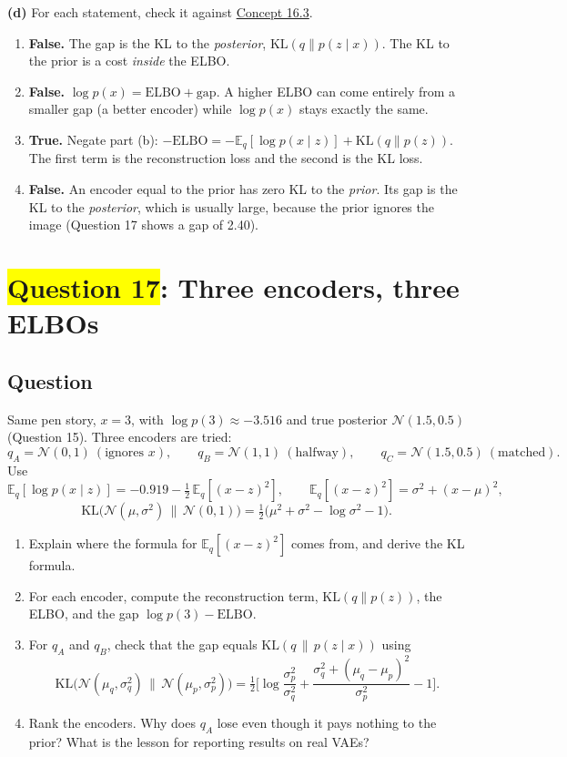 \documentclass[12pt,a4paper]{article}
\begin{document}
\textbf{(d)} For each statement, check it against \hyperref[c16-3]{Concept 16.3}.
\begin{enumerate}[label=(\roman*),nosep]
  \item \textbf{False.} The gap is the KL to the \emph{posterior}, $\mathrm{KL}(q\|p(z\mid x))$. The KL to the prior is a cost \emph{inside} the ELBO.
  \item \textbf{False.} $\log p(x)=\text{ELBO}+\text{gap}$. A higher ELBO can come entirely from a smaller gap (a better encoder) while $\log p(x)$ stays exactly the same.
  \item \textbf{True.} Negate part (b): $-\text{ELBO}=-\mathbb{E}_q[\log p(x\mid z)]+\mathrm{KL}(q\|p(z))$. The first term is the reconstruction loss and the second is the KL loss.
  \item \textbf{False.} An encoder equal to the prior has zero KL to the \emph{prior}. Its gap is the KL to the \emph{posterior}, which is usually large, because the prior ignores the image (Question 17 shows a gap of 2.40).
\end{enumerate}
\newpage
\section{\texorpdfstring{\colorbox{yellow}{Question 17}}{Question 17}: Three encoders, three ELBOs}

\subsection{Question}

Same pen story, $x=3$, with $\log p(3)\approx-3.516$ and true posterior $\mathcal{N}(1.5,0.5)$ (Question 15). Three encoders are tried:
\[
q_A=\mathcal{N}(0,1)\ (\text{ignores }x),\qquad q_B=\mathcal{N}(1,1)\ (\text{halfway}),\qquad q_C=\mathcal{N}(1.5,0.5)\ (\text{matched}).
\]
Use
\[
\mathbb{E}_q[\log p(x\mid z)]=-0.919-\tfrac12\,\mathbb{E}_q[(x-z)^2],\qquad \mathbb{E}_q[(x-z)^2]=\sigma^2+(x-\mu)^2,
\]
\[
\mathrm{KL}\big(\mathcal{N}(\mu,\sigma^2)\,\|\,\mathcal{N}(0,1)\big)=\tfrac12\big(\mu^2+\sigma^2-\log\sigma^2-1\big).
\]
\begin{enumerate}[label=(\alph*)]
  \item[\colorbox{yellow}{(a)}] Explain where the formula for $\mathbb{E}_q[(x-z)^2]$ comes from, and derive the KL formula.
  \item[\colorbox{yellow}{(b)}] For each encoder, compute the reconstruction term, $\mathrm{KL}(q\|p(z))$, the ELBO, and the gap $\log p(3)-\text{ELBO}$.
  \item For $q_A$ and $q_B$, check that the gap equals $\mathrm{KL}(q\,\|\,p(z\mid x))$ using
  \[
  \mathrm{KL}\big(\mathcal{N}(\mu_q,\sigma_q^2)\,\|\,\mathcal{N}(\mu_p,\sigma_p^2)\big)=\tfrac12\Big[\log\frac{\sigma_p^2}{\sigma_q^2}+\frac{\sigma_q^2+(\mu_q-\mu_p)^2}{\sigma_p^2}-1\Big].
  \]
  \item Rank the encoders. Why does $q_A$ lose even though it pays nothing to the prior? What is the lesson for reporting results on real VAEs?
\end{enumerate}
\end{document}
